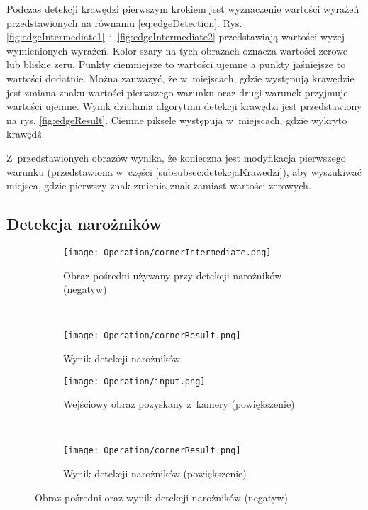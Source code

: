 Podczas detekcji krawędzi pierwszym krokiem jest wyznaczenie wartości wyrażeń przedstawionych na równaniu \eqref{eq:edgeDetection}. Rys. \ref{fig:edgeIntermediate1}~i~\ref{fig:edgeIntermediate2} przedstawiają wartości wyżej wymienionych wyrażeń. Kolor szary na tych obrazach oznacza wartości zerowe lub bliskie zeru. Punkty ciemniejsze to wartości ujemne a punkty jaśniejsze to wartości dodatnie. Można zauważyć, że w~miejscach, gdzie występują krawędzie jest zmiana znaku wartości pierwszego warunku oraz drugi warunek przyjmuje wartości ujemne. Wynik działania algorytmu detekcji krawędzi jest przedstawiony na rys. \ref{fig:edgeResult}. Ciemne piksele występują w~miejscach, gdzie wykryto krawędź.

Z~przedstawionych obrazów wynika, że konieczna jest modyfikacja pierwszego warunku (przedstawiona w~części \ref{subsubsec:detekcjaKrawedzi}), aby wyszukiwać miejsca, gdzie pierwszy znak zmienia znak zamiast wartości zerowych.

\subsection{Detekcja narożników}
\label{sec:dzialanieCorner}

\begin{figure}[h]
\begin{center}

\begin{subfigure}[t]{0.3\textwidth}
\texttt{[image: Operation/cornerIntermediate.png]}
\caption{Obraz pośredni używany przy detekcji narożników (negatyw)}
\label{fig:cornerIntermediate}
\end{subfigure}
~
\begin{subfigure}[t]{0.3\textwidth}
\texttt{[image: Operation/cornerResult.png]}
\caption{Wynik detekcji narożników}
\label{fig:cornerResult}
\end{subfigure}

\begin{subfigure}[t]{0.3\textwidth}
\texttt{[image: Operation/input.png]}
\caption{Wejściowy obraz pozyskany z~kamery (powiększenie)}
\label{fig:inputCornerZoom}
\end{subfigure}
~
\begin{subfigure}[t]{0.3\textwidth}
\texttt{[image: Operation/cornerResult.png]}
\caption{Wynik detekcji narożników (powiększenie)}
\label{fig:cornerResultZoom}
\end{subfigure}

\end{center}
\label{fig:showEdge}
\caption{Obraz pośredni oraz wynik detekcji narożników (negatyw)}
\end{figure}

